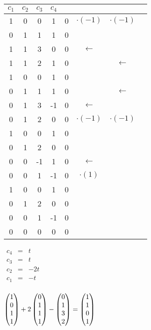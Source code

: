 \begin{enumerate}[a)]
							\begin{tabular} {cccc|cccc}
								$c_1$ & $c_2$ & $c_3$ & $c_4$ & & &\\
								\hline
								1 & 0 & 0 & 1 & 0 & $\cdot(-1)$ & $\cdot(-1)$ & \\
								0 & 1 & 1 & 1 & 0 & & & \\
								1 & 1 & 3 & 0 & 0 & $\leftarrow$ & & \\
								1 & 1 & 2 & 1 & 0 & & $\leftarrow$ & \\
								\hline
								1 & 0 & 0 & 1 & 0 & & & \\
								0 & 1 & 1 & 1 & 0 & & $\leftarrow$ & \\
								0 & 1 & 3 & -1 & 0 & $\leftarrow$ & & \\
								0 & 1 & 2 & 0 & 0 & $\cdot(-1)$ & $\cdot(-1)$ & \\
								\hline
								1 & 0 & 0 & 1 & 0 & & & \\
								0 & 1 & 2 & 0 & 0 & & & \\
								0 & 0 & -1 & 1 & 0 & $\leftarrow$ & & \\
								0 & 0 & 1 & -1 & 0 & $\cdot(1)$ & & \\
								\hline
								1 & 0 & 0 & 1 & 0 & & & \\
								0 & 1 & 2 & 0 & 0 & & & \\
								0 & 0 & 1 & -1 & 0 & & & \\
								0 & 0 & 0 & 0 & 0 & & & \\
							\end{tabular}
						
						
						$
							\begin{array} {ccc}
								c_4 & = & t\\
								c_3 & = & t\\
								c_2 & = & -2t\\
								c_1 & = & -t\\
							\end{array}$
						
						
						
							$\mvect{1\\0\\1\\1} + 2\mvect{0\\1\\1\\1} - \mvect{0\\1\\3\\2} = \mvect{1\\1\\0\\1}$
						


\end{enumerate}
